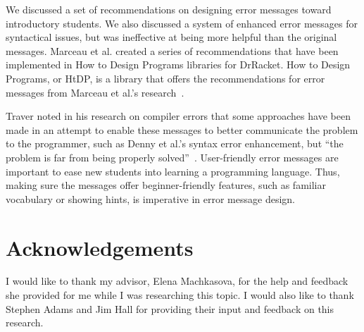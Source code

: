 \documentclass{sig-alternate}
\begin{document}
We discussed a set of recommendations on designing error messages toward introductory students.
We also discussed a system of enhanced error messages for syntactical issues, but was ineffective at being more helpful than the original messages.
Marceau et al. created a series of recommendations that have been implemented in How to Design Programs libraries for DrRacket.
How to Design Programs, or HtDP, is a library that offers the recommendations for error messages from Marceau et al.'s research~\cite{htdp-teachpacks}.

Traver noted in his research on compiler errors that some approaches have been made in an attempt to enable these messages to better communicate the problem to the programmer, such as Denny et al.'s syntax error enhancement, but ``the problem is far from being properly solved''~\cite{Traver:2010}. 
User-friendly error messages are important to ease new students into learning a programming language.
Thus, making sure the messages offer beginner-friendly features, such as familiar vocabulary or showing hints, is imperative in error message design.

\section{Acknowledgements}\label{sec:ackn}
 
I would like to thank my advisor, Elena Machkasova, for the help and feedback she provided for me while I was researching this topic.
I would also like to thank Stephen Adams and Jim Hall for providing their input and feedback on this research.

  

\end{document}
